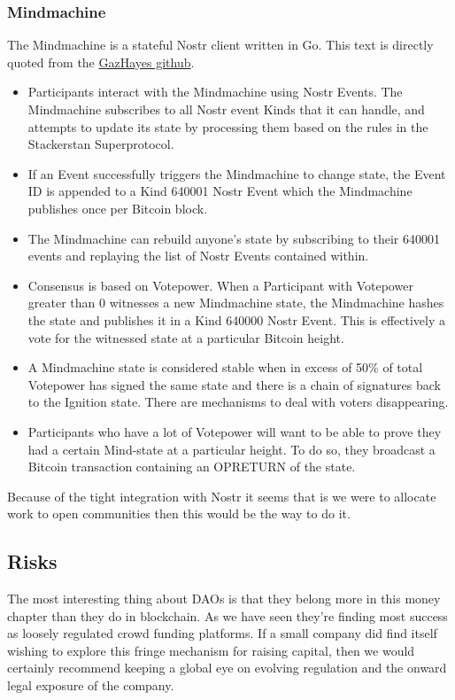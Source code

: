 \subsubsection{Mindmachine}
The Mindmachine is a stateful Nostr client written in Go. This text is directly quoted from the \href{https://github.com/gazhayes/mindmachine}{GazHayes github}.
\begin{itemize}
\item Participants interact with the Mindmachine using Nostr Events. The Mindmachine subscribes to all Nostr event Kinds that it can handle, and attempts to update its state by processing them based on the rules in the Stackerstan Superprotocol.
\item If an Event successfully triggers the Mindmachine to change state, the Event ID is appended to a Kind 640001 Nostr Event which the Mindmachine publishes once per Bitcoin block. 
\item The Mindmachine can rebuild anyone's state by subscribing to their 640001 events and replaying the list of Nostr Events contained within.
\item Consensus is based on Votepower. When a Participant with Votepower greater than 0 witnesses a new Mindmachine state, the Mindmachine hashes the state and publishes it in a Kind 640000 Nostr Event. This is effectively a vote for the witnessed state at a particular Bitcoin height.
\item A Mindmachine state is considered stable when in excess of 50\% of total Votepower has signed the same state and there is a chain of signatures back to the Ignition state. There are mechanisms to deal with voters disappearing.
\item Participants who have a lot of Votepower will want to be able to prove they had a certain Mind-state at a particular height. To do so, they broadcast a Bitcoin transaction containing an OPRETURN of the state.
\end{itemize}

Because of the tight integration with Nostr it seems that is we were to allocate work to open communities then this would be the way to do it.

\subsection{Risks}
The most interesting thing about DAOs is that they belong more in this money chapter than they do in blockchain. As we have seen they're finding most success as loosely regulated crowd funding platforms. If a small company did find itself wishing to explore this fringe mechanism for raising capital, then we would certainly recommend keeping a global eye on evolving regulation and the onward legal exposure of the company. 